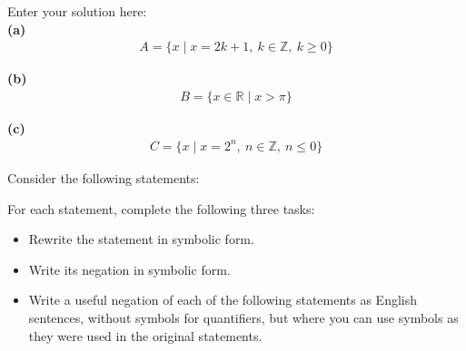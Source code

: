 \documentclass[10pt]{exam}
\begin{document}
\begin{questions}

\begin{solution}
Enter your solution here:\\
\textbf{(a)}
\begin{align*}
A = \{x \mid x = 2k+1, \ k \in \mathbb{Z}, \ k \geq 0\}
\end{align*}

\textbf{(b)}
\begin{align*}
B = \{x \in \mathbb{R} \mid x > \pi\}
\end{align*}

\textbf{(c)} 
\begin{align*}
C = \{x \mid x = 2^{n}, \ n \in \mathbb{Z}, \ n \leq 0\}
\end{align*}
\end{solution}

\question Consider the following statements:

For each statement, complete the following three tasks:
\begin{itemize}
\item Rewrite the statement in symbolic form.
\item Write its negation in symbolic form.
\item Write a useful negation of each of the following statements as English sentences, without symbols for quantifiers, but where you can use symbols as they were used in the original statements.
\end{itemize}


\end{questions}
\end{document}
